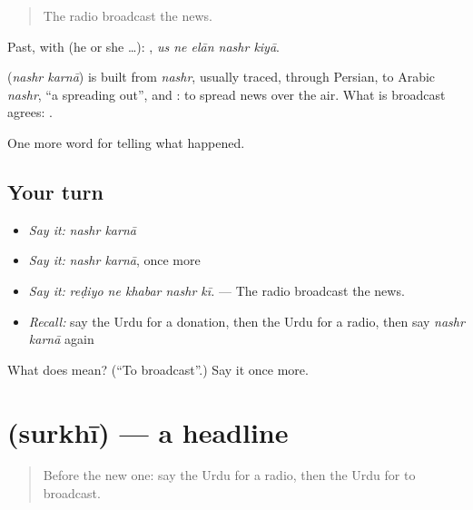 \begin{quote}
The radio broadcast the news.
\end{quote}

Past, with  (he or she …):     , \emph{us ne elān nashr kiyā}.

\begin{cousinweb}
\textbf{ } (\emph{nashr karnā}) is built from \emph{nashr}, usually traced, through Persian, to Arabic \emph{nashr}, \textquotedblleft{}a spreading out\textquotedblright{}, and \textbf{}: to spread news over the air. What is broadcast agrees: \textbf{  }.
\end{cousinweb}

\begin{grammarlens}[title={What you've built}]
One more word for telling what happened.
\end{grammarlens}

\subsection*{Your turn}
\begin{itemize}
\raggedright
  \item \emph{Say it:} \emph{nashr karnā}
  \item \emph{Say it:} \emph{nashr karnā}, once more
  \item \emph{Say it:} \emph{reḍiyo ne khabar nashr kī.} — The radio broadcast the news.
  \item \emph{Recall:} say the Urdu for a donation, then the Urdu for a radio, then say \emph{nashr karnā} again
\end{itemize}

\begin{tcolorbox}[breakable,colback=teal!4,colframe=teal!35!black,title={Before you move on}]
What does   mean? (\textquotedblleft{}To broadcast\textquotedblright{}.) Say it once more.
\end{tcolorbox}
\section[\texorpdfstring{\ur{سرخی} (surkhī)}{سرخی (surkhī)}]{ (surkhī) — a headline}

\label{lesson:UR-C300-surkhi}



\begin{quote}
Before the new one: say the Urdu for a radio, then the Urdu for to broadcast.
\end{quote}

